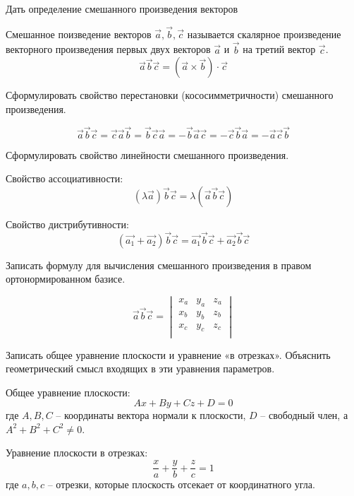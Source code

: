 \begin{question}
  Дать определение смешанного произведения векторов
\end{question}
\begin{answer}
  Смешанное поизведение векторов $\vec{a}, \vec{b}, \vec{c}$ называется скалярное произведение векторного произведения первых двух векторов $\vec{a}$ и $\vec{b}$ на третий вектор $\vec{c}$. \[
  \vec{a} \vec{b} \vec{c} = (\vec{a} \times \vec{b}) \cdot \vec{c}
  \] 
\end{answer}

\begin{question}
  Сформулировать свойство перестановки (кососимметричности) смешанного произведения.
\end{question}
\begin{answer}
  \[
  \vec{a} \vec{b} \vec{c} = \vec{c} \vec{a} \vec{b} = \vec{b} \vec{c} \vec{a} = -\vec{b} \vec{a} \vec{c} = - \vec{c} \vec{b} \vec{a} = - \vec{a} \vec{c} \vec{b}
  \] 
\end{answer}

\begin{question}
  Сформулировать свойство линейности смешанного произведения.
\end{question}
\begin{answer}
  Свойство ассоциативности: \[
    (\lambda \vec{a}) \vec{b} \vec{c} = \lambda (\vec{a} \vec{b} \vec{c})
  \] 

  Свойство дистрибутивности: \[
      (\vec{a_1} + \vec{a_2}) \vec{b} \vec{c} = \vec{a_1} \vec{b} \vec{c} + \vec{a_2} \vec{b} \vec{c}
  \]
\end{answer}


\begin{question}
  Записать формулу для вычисления смешанного произведения в правом ортонормированном базисе.
\end{question}
\begin{answer}
  \[
  \vec{a} \vec{b} \vec{c} =
    \begin{vmatrix}
      x_a & y_a & z_a \\
      x_b & y_b & z_b \\
      x_c & y_c & z_c \\
    \end{vmatrix}
  \]
\end{answer}

\begin{question}
  Записать общее уравнение плоскости и уравнение «в отрезках». Объяснить геометрический смысл входящих в эти уравнения параметров.
\end{question}
\begin{answer}
  Общее уравнение плоскости:
  \[
  Ax + By + Cz + D = 0
  \] 
  где $A, B, C$ -- координаты вектора нормали к плоскости, $D$ -- свободный член, а $A^2 + B^2 + C^2 \neq 0$.

  Уравнение плоскости в отрезках:
  \[
    \frac{x}{a} + \frac{y}{b} + \frac{z}{c} = 1
  \] 
  где $a, b, c$ -- отрезки, которые плоскость отсекает от координатного угла.
\end{answer}

